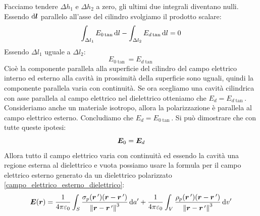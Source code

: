 Facciamo tendere $\Delta h_1$ e $\Delta h_2$ a zero, gli ultimi due integrali diventano nulli. Essendo $\mathrm{d} \boldsymbol{l}$ parallelo all'asse del cilindro svolgiamo il prodotto scalare:
\begin{equation}
  \int_{\Delta l_1}E_{0\tan}\,\mathrm{d} l-\int_{\Delta l_2}E_{d\tan}\,\mathrm{d} l=0
\end{equation}
Essendo $\Delta l_1$ uguale a $\Delta l_2$:
\begin{equation}
  E_{0\tan}=E_{d\tan}
  \label{E_tangente10}
\end{equation}
Cioè la componente parallela alla superficie del cilindro del campo elettrico interno ed esterno alla cavità in prossimità della superficie sono uguali, quindi la componente parallela varia con continuità. Se ora scegliamo una cavità cilindrica con asse parallela al campo elettrico nel dielettrico otteniamo che $E_d=E_{d\tan}$. Consideriamo anche un materiale isotropo, allora la polarizzazione è parallela al campo elettrico esterno. Concludiamo che $E_d=E_{0\tan}$. Si può dimostrare che con tutte queste ipotesi:
\begin{equation}
  \boldsymbol{E}_0=\boldsymbol{E}_d
\end{equation}
Allora tutto il campo elettrico varia con continuità ed essendo la cavità una regione esterna al dielettrico e vuota possiamo usare la formula per il campo elettrico esterno generato da un dielettrico polarizzato \eqref{campo_elettrico_esterno_dielettrico}:
\begin{equation}
  \boldsymbol{E}(\boldsymbol{r})=\frac{1}{4\pi\varepsilon_0}\int_S\frac{\sigma_p(\boldsymbol{r}\,')(\boldsymbol{r}-\boldsymbol{r}\,')}{\left\lVert\boldsymbol{r}-\boldsymbol{r}\,'\right\rVert^3}\,\mathrm{d} a'+\frac{1}{4\pi\varepsilon_0}\int_V\frac{\rho_p(\boldsymbol{r}\,')(\boldsymbol{r}-\boldsymbol{r}\,')}{\left\lVert\boldsymbol{r}-\boldsymbol{r}\,'\right\rVert^3}\,\mathrm{d} v'
\end{equation}

